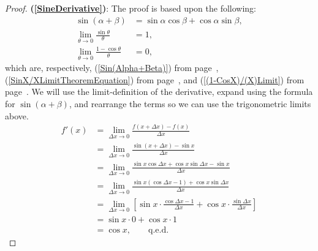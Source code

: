 \begin{proof}{\bf(\ref{SineDerivative})}: The proof is based upon
the following:
\begin{align*}
\sin(\alpha+\beta)&=\sin\alpha\cos\beta+\cos\alpha\sin\beta,\\
\lim_{\theta\to0}\frac{\sin\theta}\theta&=1,\\
\lim_{\theta\to0}\frac{1-\cos\theta}{\theta}&=0,\end{align*}
which are, respectively,
(\ref{Sin(Alpha+Beta)}) from page~\pageref{Sin(Alpha+Beta)}, 
(\ref{SinX/XLimitTheoremEquation}) from 
page~\pageref{SinX/XLimitTheoremEquation}, and
(\ref{(1-CosX)/(X)Limit}) from page~\pageref{(1-CosX)/(X)Limit}.
We will use the limit-definition of the derivative, expand
using the formula for $\sin(\alpha+\beta)$, and rearrange the
terms so we can use the trigonometric limits above.
\begin{align*}
f'(x)&=\lim_{\Delta x\to0}\frac{f(x+\Delta x)-f(x)}{\Delta x}\\
&=\lim_{\Delta x\to0}\frac{\sin(x+\Delta x)-\sin x}{\Delta x}\\
&=\lim_{\Delta x\to0}\frac{\sin x\cos\Delta x+\cos x\sin\Delta x-\sin x}
                          {\Delta x}\\
&=\lim_{\Delta x\to0}\frac{\sin x(\cos\Delta x-1)+\cos x\sin\Delta x}
                          {\Delta x}\\
&=\lim_{\Delta x\to0}\left[\sin x\cdot\frac{\cos\Delta x-1}{\Delta x}
                          +\cos x\cdot\frac{\sin\Delta x}{\Delta x}\right]\\
&=\sin x\cdot 0+\cos x\cdot 1\\
&=\cos x,\qquad\text{q.e.d.}
\end{align*}
\end{proof}
